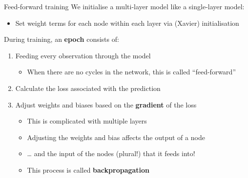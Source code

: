 \documentclass[
  ignorenonframetext,
]{beamer}
\providecommand{\tightlist}{%
  \setlength{\itemsep}{0pt}\setlength{\parskip}{0pt}}
\begin{document}
\begin{frame}{Feed-forward training}
\protect\hypertarget{feed-forward-training}{}
We initialise a multi-layer model like a single-layer model:

\begin{itemize}
\tightlist
\item
  Set weight terms for each node within each layer via (Xavier)
  initialisation
\end{itemize}

During training, an \textbf{epoch} consists of:

\begin{enumerate}
\item
  Feeding every observation through the model

  \begin{itemize}
  \tightlist
  \item
    When there are no cycles in the network, this is called
    ``feed-forward''
  \end{itemize}
\item
  Calculate the loss associated with the prediction
\item
  Adjust weights and biases based on the \textbf{gradient} of the loss

  \begin{itemize}
  \tightlist
  \item
    This is complicated with multiple layers
  \item
    Adjusting the weights and bias affects the output of a node
  \item
    \ldots{} and the input of the nodes (plural!) that it feeds into!
  \item
    This process is called \textbf{backpropagation}
  \end{itemize}
\end{enumerate}
\end{frame}
\end{document}
